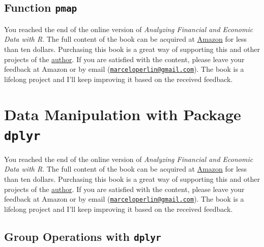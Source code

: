 \documentclass[
  12pt,
]{book}
\newenvironment{pleasebuyit}
{\begin{noteblock}
		
	} {\end{noteblock}}
\begin{document}
\hypertarget{function-pmap}{%
\subsection{\texorpdfstring{Function \texttt{pmap}}{Function pmap}}\label{function-pmap}}

\begin{pleasebuyit}
You reached the end of the online version of \emph{Analyzing Financial
and Economic Data with R}. The full content of the book can be acquired
at \href{https://www.amazon.com/dp/B084LSNXMN}{Amazon} for less than ten
dollars. Purchasing this book is a great way of supporting this and
other projects of the \href{https://www.msperlin.com/blog/}{author}. If
you are satisfied with the content, please leave your feedback at Amazon
or by email
(\href{mailto:marceloperlin@gmail.com}{\nolinkurl{marceloperlin@gmail.com}}).
The book is a lifelong project and I'll keep improving it based on the
received feedback.
\end{pleasebuyit}

\hypertarget{data-manipulation-with-package-dplyr}{%
\section{\texorpdfstring{Data Manipulation with Package \texttt{dplyr}}{Data Manipulation with Package dplyr}}\label{data-manipulation-with-package-dplyr}}

\begin{pleasebuyit}
You reached the end of the online version of \emph{Analyzing Financial
and Economic Data with R}. The full content of the book can be acquired
at \href{https://www.amazon.com/dp/B084LSNXMN}{Amazon} for less than ten
dollars. Purchasing this book is a great way of supporting this and
other projects of the \href{https://www.msperlin.com/blog/}{author}. If
you are satisfied with the content, please leave your feedback at Amazon
or by email
(\href{mailto:marceloperlin@gmail.com}{\nolinkurl{marceloperlin@gmail.com}}).
The book is a lifelong project and I'll keep improving it based on the
received feedback.
\end{pleasebuyit}

\hypertarget{group-operations-with-dplyr}{%
\subsection{\texorpdfstring{Group Operations with \texttt{dplyr}}{Group Operations with dplyr}}\label{group-operations-with-dplyr}}
\end{document}
